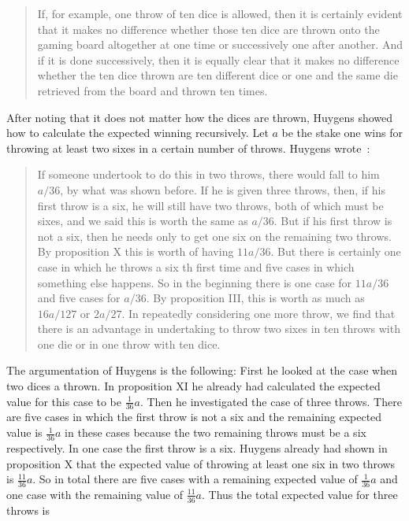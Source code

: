 \begin{quotation}
  If, for example, one throw of ten dice is allowed, then it is certainly evident that it makes no difference whether those ten dice are thrown onto the gaming board altogether at one time or successively one after another. And if it is done successively, then it is equally clear that it makes no difference whether the ten dice thrown are ten different dice or one and the same die retrieved from the board and thrown ten times.
\end{quotation}

After noting that it does not matter how the dices are thrown, Huygens showed how to calculate the expected winning recursively. Let $a$ be the stake one wins for throwing at least two sixes in a certain number of throws. Huygens wrote~\cite[p. 163]{bernoulli}:

\begin{quotation}
  If someone undertook to do this in two throws, there would fall to him $a/36$, by what was shown before. If he is given three throws, then, if his first throw is a six, he will still have two throws, both of which must be sixes, and we said this is worth the same as $a/36$. But if his first throw is not a six, then he needs only to get one six on the remaining two throws. By proposition X this is worth of having $11a/36$. But there is certainly one case in which he throws a six th first time and five cases in which something else happens. So in the beginning there is one case for $11a/36$ and five cases for $a/36$. By proposition III, this is worth as much as $16a/127$ or $2a/27$. In repeatedly considering one more throw, we find that there is an advantage in undertaking to throw two sixes in ten throws with one die or in one throw with ten dice.
\end{quotation}

The argumentation of Huygens is the following: First he looked at the case when two dices a thrown. In proposition XI he already had calculated the expected value for this case to be $\tfrac 1{36}a$. Then he investigated the case of three throws. There are five cases in which the first throw is not a six and the remaining expected value is $\tfrac 1{36}a$ in these cases because the two remaining throws must be a six respectively. In one case the first throw is a six. Huygens already had shown in proposition X that the expected value of throwing at least one six in two throws is $\tfrac{11}{36}a$. So in total there are five cases with a remaining expected value of $\tfrac 1{36}a$ and one case with the remaining value of $\tfrac{11}{36} a$. Thus the total expected value for three throws is

